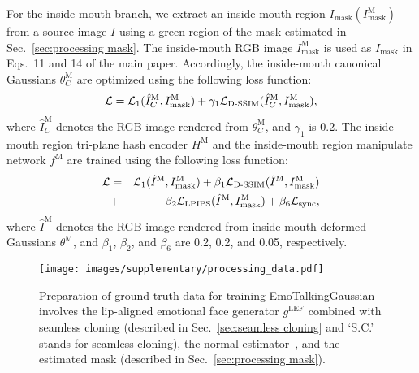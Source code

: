 For the inside-mouth branch, we extract an inside-mouth region $I_\text{mask} (I^\text{M}_\text{mask})$ from a source image $I$ using a green region of the mask estimated in Sec.~\ref{sec:processing mask}. The inside-mouth RGB image $I^\text{M}_\text{mask}$ is used as $I_\text{mask}$ in Eqs.~11 and 14 of the main paper. Accordingly, the inside-mouth canonical Gaussians $\theta^\text{M}_C$ are optimized using the following loss function:
\begin{eqnarray}
    \mathcal{L} = \mathcal{L}_1 (\hat{I}^\text{M}_C, I^\text{M}_\text{mask}) + \gamma_1 \mathcal{L}_\text{D-SSIM} (\hat{I}^\text{M}_C, I^\text{M}_\text{mask}),
\end{eqnarray}
where $\hat{I}^\text{M}_C$ denotes the RGB image rendered from $\theta^\text{M}_C$, and $\gamma_1$ is 0.2. The inside-mouth region tri-plane hash encoder $H^\text{M}$ and the inside-mouth region manipulate network $f^\text{M}$ are trained using the following loss function:
\begin{eqnarray}
    \mathcal{L} &=& \mathcal{L}_1 (\hat{I}^\text{M}, I^\text{M}_\text{mask}) + \beta_1 \mathcal{L}_\text{D-SSIM} (\hat{I}^\text{M}, I^\text{M}_\text{mask}) \nonumber \\
    &+& \beta_2 \mathcal{L}_\text{LPIPS} (\hat{I}^\text{M}, I^\text{M}_\text{mask}) + \beta_6 \mathcal{L}_\text{sync},
\end{eqnarray}
where $\hat{I}^\text{M}$ denotes the RGB image rendered from inside-mouth deformed Gaussians $\theta^\text{M}$, and $\beta_1$, $\beta_2$, and $\beta_6$ are 0.2, 0.2, and 0.05, respectively.

\begin{figure*}[t]
    \centering
    \texttt{[image: images/supplementary/processing\_data.pdf]}
    \caption{Preparation of ground truth data for training EmoTalkingGaussian involves the lip-aligned emotional face generator $g^\text{LEF}$ combined with seamless cloning (described in Sec.~\ref{sec:seamless cloning} and `S.C.' stands for seamless cloning), the normal estimator~\cite{Abrevaya_2020_CVPR}, and the estimated mask (described in Sec.~\ref{sec:processing mask}).}
    \label{fig:processing data}
\end{figure*}

